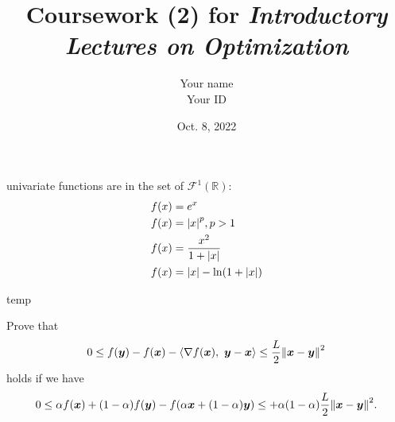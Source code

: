 \documentclass{article}
\title{Coursework (2) for \emph{Introductory Lectures on Optimization}}
\author{Your name \\ Your ID}
\date{Oct. 8, 2022}
\newcommand{\R}{\mathbb{R}}
\newcommand{\xB}{\bm{x}}
\renewcommand{\grad}{\nabla}
\newcommand{\yB}{\bm{y}}
\begin{document}
\maketitle

\begin{excercise}\label{temp}
    univariate functions are in the set of \(\mathcal{F}^1(\R)\):
    \[
        \begin{aligned}
            f(x) &= e^x\\
            f(x) &= \abs{x}^p, p>1\\
            f(x) &= \frac{x^2}{1+\abs{x}}\\
            f(x) &= \abs{x} - \ln(1 + \abs{x})
        \end{aligned}
    \]
\end{excercise}

\begin{PROOF}{temp}
    
\end{PROOF}

\begin{excercise}\label{e1}
    Prove that
    \begin{equation}  
        0 \leq f(\yB) - f(\xB) - \innerprod{\grad f(\xB)}{\yB - \xB} \leq \frac{L}{2} \norm{\xB - \yB}^2\nonumber
    \end{equation}
    holds if we have
    \begin{equation} 
        0 \leq \alpha f(\xB) + (1-\alpha) f(\yB) - f( \alpha \xB + (1-\alpha) \yB) \leq 
            + \alpha (1-\alpha) \frac{L}{2} \norm{\xB - \yB}^2. \nonumber
    \end{equation}
\end{excercise}
\end{document}
